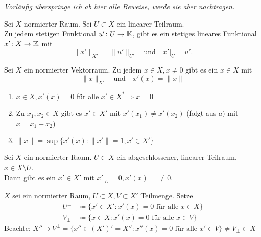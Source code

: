 \textit{Vorläufig überspringe ich ab hier alle Beweise, werde sie aber nachtragen.} %

\begin{satz}
	Sei $X$ normierter Raum. Sei $U \subset X$ ein linearer Teilraum. \\
	Zu jedem stetigen Funktional $u' \colon U \rightarrow \mathbb{K}$, gibt es ein stetiges lineares Funktional $x' \colon X \rightarrow \mathbb{K}$ mit 
		\[ \| x' \|_{X'} = \| u' \|_{U'} \quad \text{und} \quad x'|_{U} = u'. \]	
\end{satz}


\begin{kor}
	Sei $X$ ein normierter Vektorraum. Zu jedem $x \in X, x \neq 0$ gibt es ein $x \in X$ mit 
		\[ \| x \|_{X'} \quad \text{und} \quad x'(x) = \| x \| \]
\end{kor}


\begin{folgerung}
	\begin{enumerate}[label=\alph*\upshape)]
		\item $x \in X, x'(x) = 0$ für alle $x' \in X^{*} \Rightarrow x = 0$
		\item Zu $x_{1}, x_{2} \in X$ gibt es $x' \in X'$ mit $x'(x_{1}) \neq x'(x_{2})$ (folgt aus $a)$ mit $x = x_{1} - x_{2}$)
		\item $\| x \| = \sup \{ x'(x) : \| x' \| = 1, x' \in X' \}$
	\end{enumerate}	
\end{folgerung}


\begin{kor}
	Sei $X$ ein normierter Raum. $U \subset X$ ein abgeschlossener, linearer Teilraum, $x \in X \setminus U$. \\
	Dann gibt es ein $x' \in X'$ mit $x'|_{U} = 0, x'(x) =\neq 0$.	
\end{kor}


\begin{definition}
	$X$ sei ein normierter Raum, $U \subset X, V \subset X'$ Teilmenge. Setze
	\begin{align*}
		U^{\bot} & \coloneqq \{ x' \in X' : x'(x) = 0 \text{ für alle } x \in X \} \\
		V_{\bot} & \coloneqq \{ x \in X : x'(x) = 0 \text{ für alle } x \in V \} 
	\end{align*}
	Beachte: $X'' \supset V^{\bot} = \{  x'' \in \left( X' \right)' = X'' : x''(x) = 0 \text{ für alle } x' \in V \} \neq V_{\bot} \subset X$
\end{definition}


